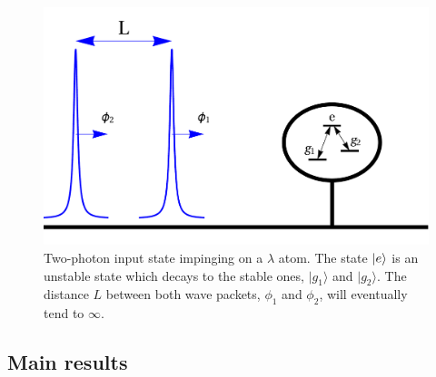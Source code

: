 \documentclass[notitlepage, prx, preprint, amsmath,superscriptaddress,amssymb]{revtex4-1}
\begin{document}
  
\begin{figure}
\includegraphics[scale=0.25]{input.pdf}
\caption{Two-photon input state impinging on a $\lambda$ atom. The state $\ket{e}$ is an unstable state which decays to the stable ones, $|g_1\rangle$ and $|g_2\rangle$. The distance $L$ between both wave packets, $\phi_1$ and $\phi_2$, will eventually tend to $\infty$.}
\label{fig:input}
\end{figure}





\subsection{Main results}
\end{document}
